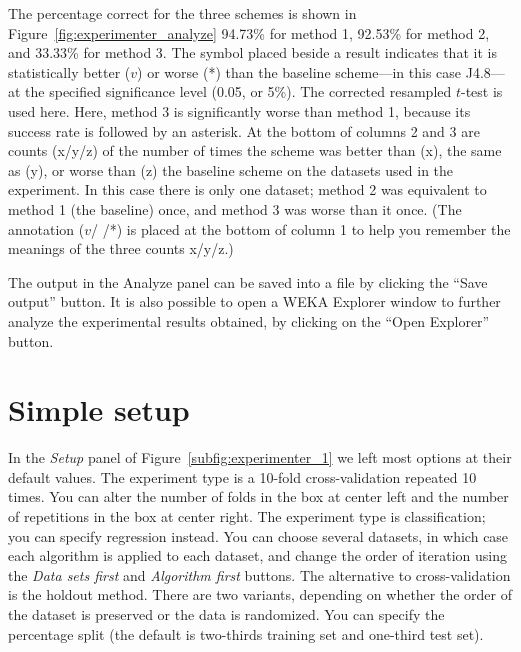 The percentage correct for the three schemes is shown in
Figure~\ref{fig:experimenter_analyze} 94.73\% for method 1, 92.53\%
for method 2, and 33.33\% for method 3. The symbol placed beside a
result indicates that it is statistically better ($v$) or worse (*)
than the baseline scheme---in this case J4.8---at the specified
significance level (0.05, or 5\%). The corrected resampled $t$-test is
used here. Here, method 3 is significantly worse than method 1,
because its success rate is followed by an asterisk. At the bottom of
columns 2 and 3 are counts (x/y/z) of the number of times the scheme
was better than (x), the same as (y), or worse than (z) the baseline
scheme on the datasets used in the experiment. In this case there is
only one dataset; method 2 was equivalent to method 1 (the baseline)
once, and method 3 was worse than it once. (The annotation ($v$/  /*) is
placed at the bottom of column 1 to help you remember the meanings of
the three counts x/y/z.)

The output in the Analyze panel can be saved into a file by clicking
the ``Save output'' button. It is also possible to open a WEKA Explorer
window to further analyze the experimental results obtained, by
clicking on the ``Open Explorer'' button.

\section{Simple setup}

In the \textit{Setup} panel of Figure~\ref{subfig:experimenter_1} we
left most options at their default values. The experiment type is a
10-fold cross-validation repeated 10 times. You can alter the number
of folds in the box at center left and the number of repetitions in
the box at center right. The experiment type is classification; you
can specify regression instead. You can choose several datasets, in
which case each algorithm is applied to each dataset, and change the
order of iteration using the \textit{Data sets first} and
\textit{Algorithm first} buttons. The alternative to cross-validation
is the holdout method. There are two variants, depending on whether
the order of the dataset is preserved or the data is randomized. You
can specify the percentage split (the default is two-thirds training
set and one-third test set).

